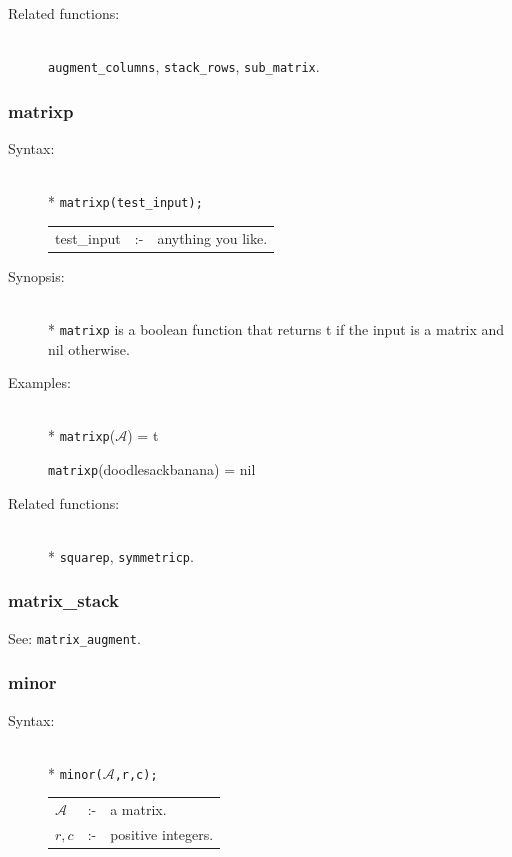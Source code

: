 {\begin{description}
\item[Related functions:]\mbox{}\\
\texttt{augment\_columns}, \texttt{stack\_rows},
\texttt{sub\_matrix}.
\end{description}


\subsubsection{matrixp}
\label{linalg:matrixp}
\hypertarget{operator:MATRIXP}{}

\begin{description}
\item[Syntax:]\mbox{}\\*
\texttt{matrixp(test\_input);}\\[2mm]
\begin{tabular}{l l l}
test\_input &:-& anything you like.
\end{tabular}

\item[Synopsis:]\mbox{}\\*
\texttt{matrixp} is a boolean function that returns t if
                the input is a matrix and nil otherwise.

\item[Examples:]\mbox{}\\*
\texttt{matrixp}($\mathcal{A}$) = t

\texttt{matrixp}(doodlesackbanana) = nil

\item[Related functions:]\mbox{}\\*
\texttt{squarep}, \texttt{symmetricp}.
\end{description}


\subsubsection{matrix\_stack}
\label{linalg:matrix_stack}
\hypertarget{operator:MATRIX_STACK}{}
See: \texttt{matrix\_augment}.


\subsubsection{minor}
\label{linalg:minor}
\hypertarget{operator:MINOR}{}

\begin{description}
\item[Syntax:]\mbox{}\\*
{\tt minor($\mathcal{A}$,r,c);}\\[2mm]
\begin{tabular}{l l l}
$\mathcal{A}$ &:-& a matrix. \\
$r,c$        &:-& positive integers.
\end{tabular}


\end{description}}
